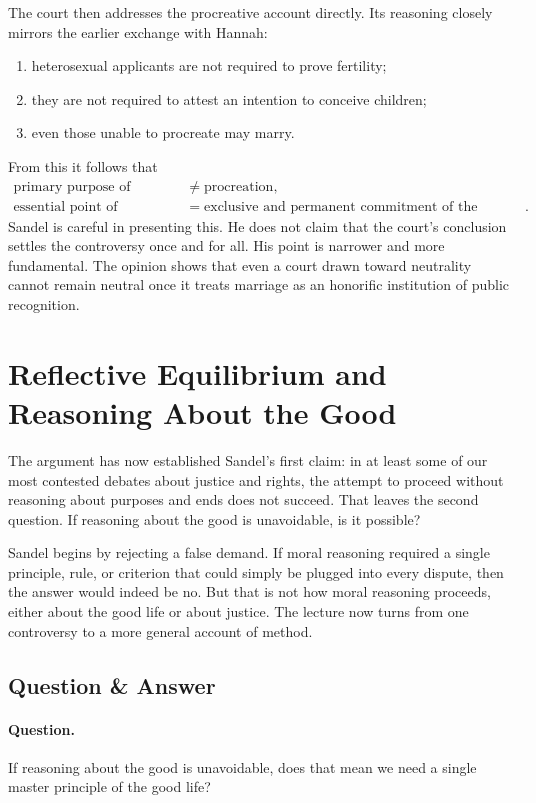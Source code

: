 The court then addresses the procreative account directly. Its reasoning closely mirrors the earlier exchange with Hannah:
\begin{enumerate}
\item heterosexual applicants are not required to prove fertility;
\item they are not required to attest an intention to conceive children;
\item even those unable to procreate may marry.
\end{enumerate}
From this it follows that
\begin{align}
\text{primary purpose of marriage}
&\neq
\text{procreation},\\
\text{essential point of marriage}
&=
\text{exclusive and permanent commitment of the partners}.
\end{align}
Sandel is careful in presenting this. He does not claim that the court's conclusion settles the controversy once and for all. His point is narrower and more fundamental. The opinion shows that even a court drawn toward neutrality cannot remain neutral once it treats marriage as an honorific institution of public recognition.

\section{Reflective Equilibrium and Reasoning About the Good}

The argument has now established Sandel's first claim: in at least some of our most contested debates about justice and rights, the attempt to proceed without reasoning about purposes and ends does not succeed. That leaves the second question. If reasoning about the good is unavoidable, is it possible?

Sandel begins by rejecting a false demand. If moral reasoning required a single principle, rule, or criterion that could simply be plugged into every dispute, then the answer would indeed be no. But that is not how moral reasoning proceeds, either about the good life or about justice. The lecture now turns from one controversy to a more general account of method.

\subsection{Question \& Answer}

\paragraph{Question.} If reasoning about the good is unavoidable, does that mean we need a single master principle of the good life?

